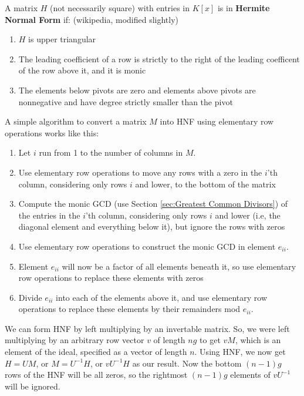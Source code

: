 
A matrix $H$ (not necessarily square) with entries in $K[x]$ is in {\bf Hermite Normal Form} if: (wikipedia, modified slightly)
\begin{enumerate}
\item $H$ is upper triangular
\item The leading coefficient of a row is strictly to the right of the leading coefficent of the row above it, and it is monic
\item The elements below pivots are zero and elements above pivots are nonnegative and have degree strictly smaller than the pivot
\end{enumerate}

A simple algorithm to convert a matrix $M$ into HNF using elementary row operations works like this:
\begin{enumerate}
\item Let $i$ run from 1 to the number of columns in $M$.
\item Use elementary row operations to move any rows with a zero in the $i$'th column,
considering only rows $i$ and lower, to the bottom of the matrix
\item Compute the monic GCD (use Section \ref{sec:Greatest Common Divisors}) of the entries in the $i$'th column, considering
only rows $i$ and lower (i.e, the diagonal element and everything below it), but ignore the rows with zeros
\item Use elementary row operations to construct the monic GCD in element $e_{ii}$.
\item Element $e_{ii}$ will now be a factor of all elements beneath it, so use elementary row operations
to replace these elements with zeros
\item Divide $e_{ii}$ into each of the elements above it, and use elementary row operations to replace these elements
by their remainders mod $e_{ii}$.
\end{enumerate}

We can form HNF by left multiplying by an invertable matrix.  So, we were left multiplying by an arbitrary
row vector $v$ of length $ng$ to get $vM$, which is an element of the ideal, specified as a vector of length $n$.
Using HNF, we now get $H=UM$, or $M=U^{-1}H$, or $vU^{-1}H$ as our result.  Now the bottom $(n-1)g$ rows
of the HNF will be all zeros, so the rightmost $(n-1)g$ elements of $vU^{-1}$ will be ignored.

